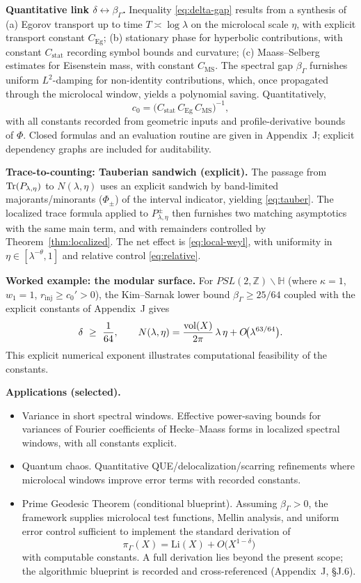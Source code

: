 \medskip
\noindent\textbf{Quantitative link $\delta\leftrightarrow\beta_\Gamma$.}
Inequality \eqref{eq:delta-gap} results from a synthesis of
(a) Egorov transport up to time $T\asymp\log\lambda$ on the microlocal scale $\eta$, with explicit transport constant $C_{\mathrm{Eg}}$;
(b) stationary phase for hyperbolic contributions, with constant $C_{\mathrm{stat}}$ recording symbol bounds and curvature;
(c) Maass--Selberg estimates for Eisenstein mass, with constant $C_{\mathrm{MS}}$.
The spectral gap $\beta_\Gamma$ furnishes uniform $L^2$-damping for non-identity contributions, which, once propagated through the microlocal window, yields a polynomial saving. Quantitatively,
\[
c_0=\Big(C_{\mathrm{stat}}\,C_{\mathrm{Eg}}\,C_{\mathrm{MS}}\Big)^{-1},
\]
with all constants recorded from geometric inputs and profile-derivative bounds of $\Phi$. Closed formulas and an evaluation routine are given in Appendix~J; explicit dependency graphs are included for auditability.

\medskip
\noindent\textbf{Trace-to-counting: Tauberian sandwich (explicit).}
The passage from $\operatorname{Tr}(P_{\lambda,\eta})$ to $N(\lambda,\eta)$ uses an explicit sandwich by band-limited majorants/minorants ($\Phi_\pm$) of the interval indicator, yielding \eqref{eq:tauber}. The localized trace formula applied to $P^\pm_{\lambda,\eta}$ then furnishes two matching asymptotics with the same main term, and with remainders controlled by Theorem~\ref{thm:localized}. The net effect is \eqref{eq:local-weyl}, with uniformity in $\eta\in[\lambda^{-\theta},1]$ and relative control \eqref{eq:relative}.

\medskip
\noindent\textbf{Worked example: the modular surface.}
For $PSL(2,\mathbb{Z})\backslash\mathbb{H}$ (where $\kappa=1$, $w_1=1$, $r_{\mathrm{inj}}\ge c_0'>0$), the Kim--Sarnak lower bound $\beta_\Gamma\ge 25/64$ coupled with the explicit constants of Appendix~J gives
\[
\delta\ \ge\ \frac{1}{64},\qquad 
N(\lambda,\eta)=\frac{\operatorname{vol}(X)}{2\pi}\,\lambda\,\eta + O\!\big(\lambda^{63/64}\big).
\]
This explicit numerical exponent illustrates computational feasibility of the constants.

\medskip
\noindent\textbf{Applications (selected).}
\begin{itemize}
\item Variance in short spectral windows. Effective power-saving bounds for variances of Fourier coefficients of Hecke--Maass forms in localized spectral windows, with all constants explicit.
\item Quantum chaos. Quantitative QUE/delocalization/scarring refinements where microlocal windows improve error terms with recorded constants.
\item Prime Geodesic Theorem (conditional blueprint). Assuming $\beta_\Gamma>0$, the framework supplies microlocal test functions, Mellin analysis, and uniform error control sufficient to implement the standard derivation of
\[
\pi_\Gamma(X)=\mathrm{Li}(X)+O\!\big(X^{1-\delta}\big)
\]
with computable constants. A full derivation lies beyond the present scope; the algorithmic blueprint is recorded and cross-referenced (Appendix~J, \S J.6).
\end{itemize}

